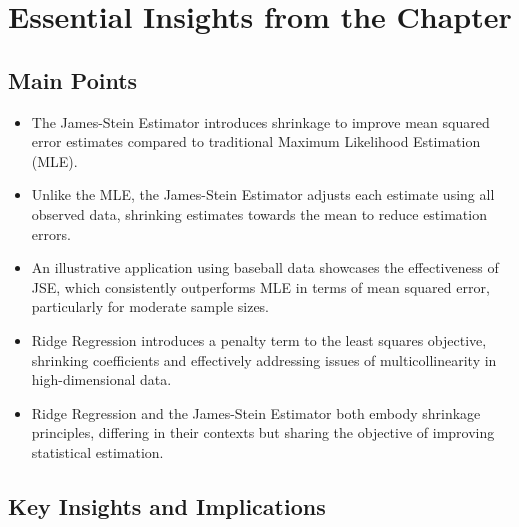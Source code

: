 \section{Essential Insights from the Chapter}

\subsection{Main Points}

\begin{itemize}
    \item The James-Stein Estimator introduces shrinkage to improve mean squared error estimates compared to traditional Maximum Likelihood Estimation (MLE).
    \item Unlike the MLE, the James-Stein Estimator adjusts each estimate using all observed data, shrinking estimates towards the mean to reduce estimation errors.
    \item An illustrative application using baseball data showcases the effectiveness of JSE, which consistently outperforms MLE in terms of mean squared error, particularly for moderate sample sizes.
    \item Ridge Regression introduces a penalty term to the least squares objective, shrinking coefficients and effectively addressing issues of multicollinearity in high-dimensional data.
    \item Ridge Regression and the James-Stein Estimator both embody shrinkage principles, differing in their contexts but sharing the objective of improving statistical estimation.
\end{itemize}

\subsection{Key Insights and Implications}

